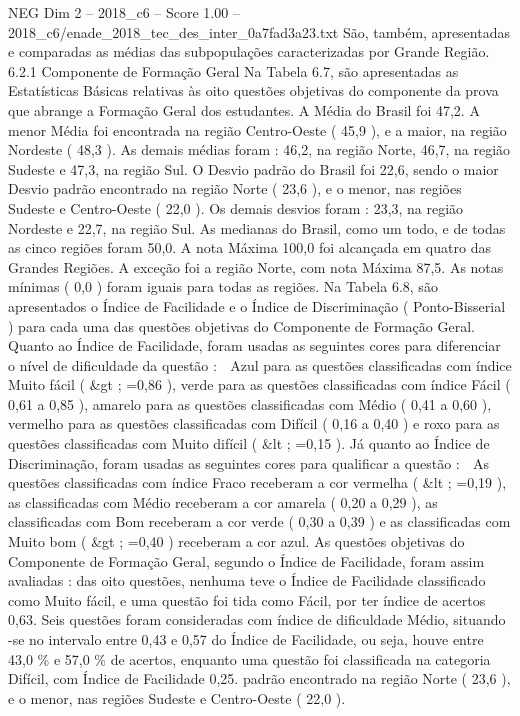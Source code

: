 \begin{textsample}{NEG Dim 2 – 2018\_c6 – Score 1.00 – 2018\_c6/enade\_2018\_tec\_des\_inter\_0a7fad3a23.txt}
São, também, apresentadas e comparadas as médias das subpopulações caracterizadas por Grande Região. 6.2.1 Componente de Formação Geral Na Tabela 6.7, são apresentadas as Estatísticas Básicas relativas às oito questões objetivas do componente da prova que abrange a Formação Geral dos estudantes.
A Média do Brasil foi 47,2.
A menor Média foi encontrada na região Centro-Oeste ( 45,9 ), e a maior, na região Nordeste ( 48,3 ).
As demais médias foram : 46,2, na região Norte, 46,7, na região Sudeste e 47,3, na região Sul.
O Desvio padrão do Brasil foi 22,6, sendo o maior Desvio padrão encontrado na região Norte ( 23,6 ), e o menor, nas regiões Sudeste e Centro-Oeste ( 22,0 ).
Os demais desvios foram : 23,3, na região Nordeste e 22,7, na região Sul.
As medianas do Brasil, como um todo, e de todas as cinco regiões foram 50,0.
A nota Máxima 100,0 foi alcançada em quatro das Grandes Regiões.
A exceção foi a região Norte, com nota Máxima 87,5.
As notas mínimas ( 0,0 ) foram iguais para todas as regiões.
Na Tabela 6.8, são apresentados o Índice de Facilidade e o Índice de Discriminação ( Ponto-Bisserial ) para cada uma das questões objetivas do Componente de Formação Geral.
Quanto ao Índice de Facilidade, foram usadas as seguintes cores para diferenciar o nível de dificuldade da questão :  Azul para as questões classificadas com índice Muito fácil ( \&gt ; =0,86 ), verde para as questões classificadas com índice Fácil ( 0,61 a 0,85 ), amarelo para as questões classificadas com Médio ( 0,41 a 0,60 ), vermelho para as questões classificadas com Difícil ( 0,16 a 0,40 ) e roxo para as questões classificadas com Muito difícil ( \&lt ; =0,15 ).
Já quanto ao Índice de Discriminação, foram usadas as seguintes cores para qualificar a questão :  As questões classificadas com índice Fraco receberam a cor vermelha ( \&lt ; =0,19 ), as classificadas com Médio receberam a cor amarela ( 0,20 a 0,29 ), as classificadas com Bom receberam a cor verde ( 0,30 a 0,39 ) e as classificadas com Muito bom ( \&gt ; =0,40 ) receberam a cor azul.
As questões objetivas do Componente de Formação Geral, segundo o Índice de Facilidade, foram assim avaliadas : das oito questões, nenhuma teve o Índice de Facilidade classificado como Muito fácil, e uma questão foi tida como Fácil, por ter índice de acertos 0,63.
Seis questões foram consideradas com índice de dificuldade Médio, situando -se no intervalo entre 0,43 e 0,57 do Índice de Facilidade, ou seja, houve entre 43,0 \% e 57,0 \% de acertos, enquanto uma questão foi classificada na categoria Difícil, com Índice de Facilidade 0,25. padrão encontrado na região Norte ( 23,6 ), e o menor, nas regiões Sudeste e Centro-Oeste ( 22,0 ).

\end{textsample}
